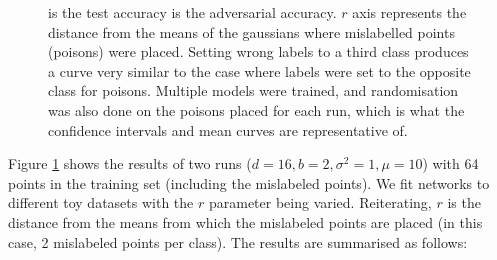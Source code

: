 \documentclass[12pt, oneside]{book}
\begin{document}
\begin{figure}[!h]
    \centering
    \qquad
    \caption{ is the
    test accuracy  is the
    adversarial accuracy. $r$ axis represents the distance from the means of the
    gaussians where mislabelled points (poisons) were placed. Setting wrong
    labels to a third class produces a curve very similar to the case where
    labels were set to the opposite class for poisons. Multiple models were
    trained, and randomisation was also done on the poisons placed for each run,
    which is what the confidence intervals and mean curves are representative
    of.}
    \label{fig:far-gaussian-curve}
\end{figure}

Figure \ref{fig:far-gaussian-curve} shows the results of two runs ($d=16, b=2,
\sigma^2=1, \mu=10$) with 64 points in the training set (including the
mislabeled points). We fit networks to different toy datasets with the $r$
parameter being varied. Reiterating, $r$ is the distance from the means from
which the mislabeled points are placed (in this case, 2 mislabeled points per
class). The results are summarised as follows:
\end{document}
